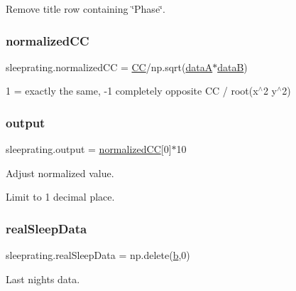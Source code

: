 Remove title row containing \char`\"{}\+Phase\char`\"{}. 

\mbox{\label{namespacesleeprating_ab32193f6862474b22eb3867a4705ed42}} 
\subsubsection{\texorpdfstring{normalized\+CC}{normalizedCC}}
{\footnotesize\ttfamily sleeprating.\+normalized\+CC = \mbox{\hyperlink{namespacesleeprating_abe9d10de2c37eaa74afd164d3121680c}{CC}}/np.\+sqrt(\mbox{\hyperlink{namespacesleeprating_aab6cbcbccfa89f1cdeedee015ea70002}{dataA}}$\ast$\mbox{\hyperlink{namespacesleeprating_ab660d30857a5b0d3afabc6a91d7b24e2}{dataB}})}



1 = exactly the same, -\/1 completely opposite CC / root(x$^\wedge$2 y$^\wedge$2) 

\mbox{\label{namespacesleeprating_a11e97cac9b74432fdff92d0cb7e069ef}} 
\subsubsection{\texorpdfstring{output}{output}}
{\footnotesize\ttfamily sleeprating.\+output = \mbox{\hyperlink{namespacesleeprating_ab32193f6862474b22eb3867a4705ed42}{normalized\+CC}}\mbox{[}0\mbox{]}$\ast$10}



Adjust normalized value. 

Limit to 1 decimal place. \mbox{\label{namespacesleeprating_a69adab626860ce563388eca964e80eb0}} 
\subsubsection{\texorpdfstring{real\+Sleep\+Data}{realSleepData}}
{\footnotesize\ttfamily sleeprating.\+real\+Sleep\+Data = np.\+delete(\mbox{\hyperlink{namespacesleeprating_a0daef533b07f6252a2dad70552a90082}{b}},0)}



Last nights data. 

